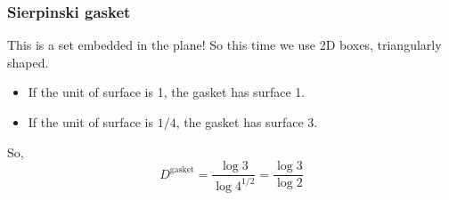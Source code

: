 \documentclass[11pt]{article}
\begin{document}
\subsubsection{Sierpinski gasket}
This is a set embedded in the plane! So this time we use 2D boxes, triangularly shaped.
\begin{itemize}
	\item If the unit of surface is 1, the gasket has surface 1.
	\item If the unit of surface is $1/4$, the gasket has surface 3.
\end{itemize}
So, 
\begin{equation}
	D^{\text{gasket}} = \frac{\log 3}{\log 4^{1/2}} = \frac{\log 3}{\log 2}
\end{equation}
\end{document}
